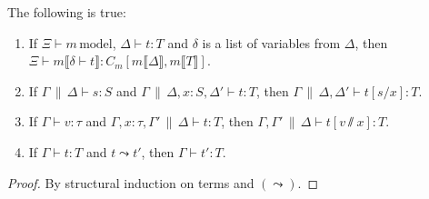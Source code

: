 \begin{theorem}
    The following is true:
    \begin{enumerate}
        \item If $\Xi\vdash m\,\mathrm{model}$,
            $\Delta\vdash t:T$ and $\delta$ is a list of
            variables from $\Delta$, then \\ $\Xi\vdash
            m\llbracket\delta\vdash t\rrbracket:
            C_m[m\llbracket\Delta\rrbracket,
            m\llbracket T\rrbracket]$.
        \item If $\Gamma\,\|\,\Delta\vdash s:S$ and
            $\Gamma\,\|\,\Delta,x:S,\Delta'\vdash t:T$,
            then $\Gamma\,\|\,\Delta,\Delta'\vdash
            t[s/x]:T$.
        \item If $\Gamma\vdash v:\tau$ and
            $\Gamma,x:\tau,\Gamma'\,\|\,\Delta\vdash
            t:T$, then
            $\Gamma,\Gamma'\,\|\,\Delta\vdash
            t[v\sslash x]:T$.
        \item If $\Gamma\vdash t:T$ and $t\leadsto t'$,
            then $\Gamma\vdash t':T$.
    \end{enumerate}
\end{theorem}
\begin{proof}
    By structural induction on terms and $(\leadsto)$.
\end{proof}

